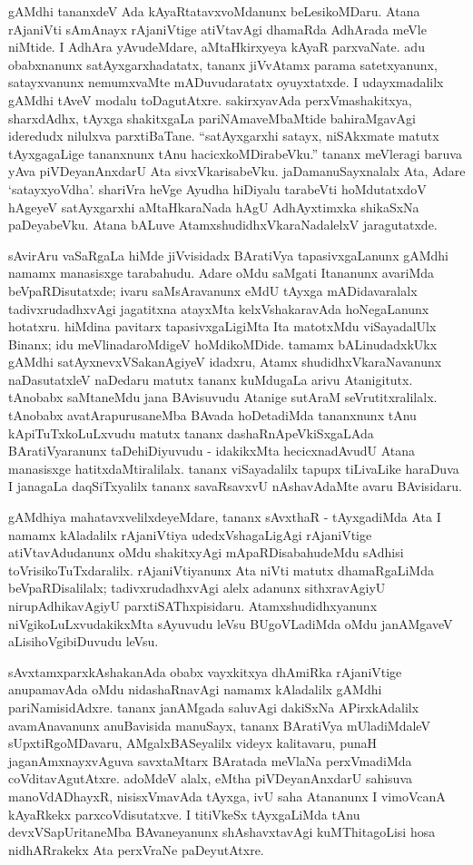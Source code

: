 gAMdhi tananxdeV Ada kAyaRtatavxvoMdanunx beLesikoMDaru. Atana rAjaniVti sAmAnayx rAjaniVtige atiVtavAgi dhamaRda AdhArada meVle niMtide. I AdhAra yAvudeMdare, aMtaHkirxyeya kAyaR parxvaNate. adu obabxnanunx satAyxgarxhadatatx, tananx jiVvAtamx parama satetxyanunx, satayxvanunx nemumxvaMte mADuvudaratatx oyuyxtatxde. I udayxmadalilx gAMdhi tAveV modalu toDagutAtxre. sakirxyavAda perxVmashakitxya, sharxdAdhx, tAyxga shakitxgaLa pariNAmaveMbaMtide bahiraMgavAgi ideredudx nilulxva parxtiBaTane. ``satAyxgarxhi satayx, niSAkxmate matutx tAyxgagaLige tananxnunx tAnu hacicxkoMDirabeVku.'' tananx meVleragi baruva yAva piVDeyanAnxdarU Ata sivxVkarisabeVku. jaDamanuSayxnalalx Ata, Adare `satayxyoVdha'. shariVra heVge Ayudha hiDiyalu tarabeVti hoMdutatxdoV hAgeyeV satAyxgarxhi aMtaHkaraNada hAgU AdhAyxtimxka shikaSxNa paDeyabeVku. Atana bALuve AtamxshudidhxVkaraNadalelxV jaragutatxde.

sAvirAru vaSaRgaLa hiMde jiVvisidadx BAratiVya tapasivxgaLanunx gAMdhi namamx manasisxge tarabahudu. Adare oMdu saMgati Itananunx avariMda beVpaRDisutatxde; ivaru saMsAravanunx eMdU tAyxga mADidavaralalx tadivxrudadhxvAgi jagatitxna atayxMta kelxVshakaravAda hoNegaLanunx hotatxru. hiMdina pavitarx tapasivxgaLigiMta Ita matotxMdu viSayadalUlx Binanx; idu meVlinadaroMdigeV hoMdikoMDide. tamamx bALinudadxkUkx gAMdhi satAyxnevxVSakanAgiyeV idadxru, Atamx shudidhxVkaraNavanunx naDasutatxleV naDedaru matutx tananx kuMdugaLa arivu Atanigitutx. tAnobabx saMtaneMdu jana BAvisuvudu Atanige sutAraM seVrutitxralilalx. tAnobabx avatArapurusaneMba BAvada hoDetadiMda tananxnunx tAnu kApiTuTxkoLuLxvudu matutx tananx dashaRnApeVkiSxgaLAda BAratiVyaranunx taDehiDiyuvudu - idakikxMta hecicxnadAvudU Atana manasisxge hatitxdaMtiralilalx. tananx viSayadalilx tapupx tiLivaLike haraDuva I janagaLa daqSiTxyalilx tananx savaRsavxvU nAshavAdaMte avaru BAvisidaru.

gAMdhiya mahatavxvelilxdeyeMdare, tananx sAvxthaR - tAyxgadiMda Ata I namamx kAla\-dalilx rAjaniVtiya udedxVshagaLigAgi rAjaniVtige atiVtavAdudanunx oMdu shakitxyAgi mApaRDisabahudeMdu sAdhisi toVrisikoTuTxdaralilx. rAjaniVtiyanunx Ata niVti matutx dhamaRgaLiMda beVpaRDisalilalx; tadivxrudadhxvAgi alelx adanunx sithxravAgiyU nirupAdhika\-vAgiyU parxtiSAThxpisidaru. Atamxshudidhxyanunx niVgikoLuLxvudakikxMta sAyuvudu leVsu BUgoVLadiMda oMdu janAMgaveV aLisihoVgibiDuvudu leVsu.

sAvxtamxparxkAshakanAda obabx vayxkitxya dhAmiRka rAjaniVtige anupamavAda oMdu nidashaRnavAgi namamx kAladalilx gAMdhi pariNamisidAdxre. tananx janAMgada saluvAgi dakiSxNa APirxkAdalilx avamAnavanunx anuBavisida manuSayx, tananx BAratiVya mUladiMdaleV sUpxtiRgoMDavaru, AMgalxBASeyalilx videyx kalitavaru, punaH jaganAmxnayxvAguva savxtaMtarx BAratada meVlaNa perxVmadiMda coVditavAgutAtxre. adoMdeV alalx, eMtha piVDeyanAnxdarU sahisuva manoVdADhayxR, nisisxVmavAda tAyxga, ivU saha Atananunx I vimoVcanA kAyaRkekx parxcoVdisutatxve. I titiVkeSx tAyxgaLiMda tAnu devxVSapUritaneMba BAvaneyanunx shAshavxtavAgi kuMThitagoLisi hosa nidhARrakekx Ata perxVraNe paDeyutAtxre.

